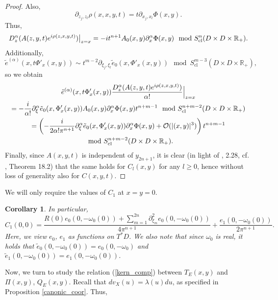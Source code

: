 \documentclass{article}
\newtheorem{corollary}[theorem]{Corollary}
\newcommand{\RR}{\mathbb R}
\newcommand{\mco}{\mathcal O}
\DeclareMathOperator{\cl}{cl}
\begin{document}
\begin{proof}
Also,
\begin{equation*} \partial_{z_j, z_l} \rho(x,x,y,t) = t \partial_{x_j, x_l} \Phi(x,y).\end{equation*}
%
Thus,
\begin{equation*} D^\alpha_z(A(z,y,t) e^{i\rho(z,x,y,t)})\big{|}_{z=x} = -i t^{n+1}A_0(x,y) \partial^\alpha_{x} \Phi(x,y) \mod S^{n}_{\cl}(D \times D \times \RR_+).\end{equation*}
Additionally,
\begin{equation*} \tilde e^{(\alpha)}(x, t \Phi'_x(x,y)) \sim t^{m-2} \partial_{\xi_j, \xi_l} \tilde e_0(x, \Phi'_x(x,y)) \mod S^{m-3}_{\cl}(D \times D \times \RR_+),\end{equation*}
so we obtain
\begin{multline*} \tilde e^{(\alpha)}(x, t\Phi'_x(x,y)) \frac{D^\alpha_z(A(z,y,t) e^{i \rho(z,x,y,t)})}{\alpha!}\Big{|}_{z=x} \\= - \frac i {\alpha!}  \partial^\alpha_{\xi} \tilde e_0(x, \Phi'_x(x,y)) A_0(x,y) \partial^\alpha_{x} \Phi(x,y)t^{n+m-1}\mod S^{n+m-2}_{\cl}(D \times D \times \RR_+)\\ = \left(-\frac i {2\alpha!\pi^{n+1}} \partial^\alpha_{\xi} \tilde e_0(x, \Phi'_x(x,y)) \partial^\alpha_{x} \Phi(x,y) + \mco(|(x,y)|^3) \right)t^{n+m-1} \\\mod S^{n+m-2}_{\cl}(D \times D \times \RR_+).\end{multline*}
Finally, since $A(x,y,t)$ is independent of $y_{2n+1}$, it is clear (in light of \cite{ms}, 2.28, cf. \cite{shubin}, Theorem 18.2) that the same holds for $C_l(x,y)$ for any $l \ge 0$, hence without loss of generality also for $C(x,y,t)$.
\end{proof}
%
We will only require the values of $C_{1}$ at $x = y = 0$.
\begin{corollary}\label{c_1_at_0} In particular,
\begin{equation*} C_{1}(0,0) = \frac{R(0)e_0(0, -\omega_0(0)) +\sum_{m=1}^{2n} \partial^2_{\xi_m} e_0(0, -\omega_0(0))}{4 \pi^{n+1}}+ \frac{e_1(0, -\omega_0(0))}{2\pi^{n+1}} .\end{equation*}
Here, we view $e_0$, $e_1$ as functions on $T^*D$. We also note that since $\omega_0$ is real, it holds that $\tilde e_0(0, -\omega_0(0)) = e_0(0, -\omega_0)$ and $\tilde e_1(0, -\omega_0(0)) = e_1(0, -\omega_0(0))$. \end{corollary}
%
Now, we turn to study the relation (\ref{kern_comp}) between $T_E(x,y)$ and $\Pi(x,y)$, $Q_E(x,y)$. Recall that $dv_X(u) = \lambda(u) du$, as specified in Proposition \ref{canonic_coor}. Thus,
\end{document}
